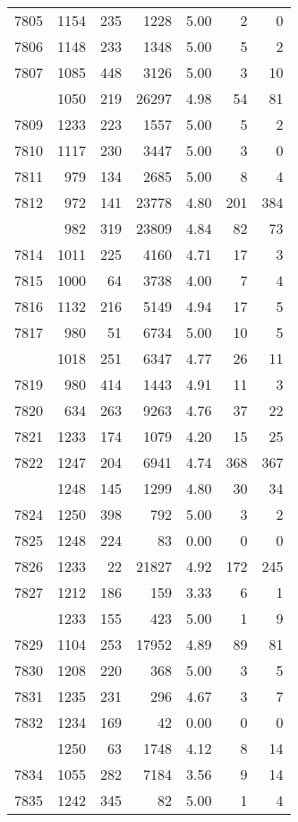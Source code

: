 \documentclass[
]{article}
\begin{document}
\begin{table}
\begin{tabular}[t]{lrrrrrr}
7805 & 1154 & 235 & 1228 & 5.00 & 2 & 0\\
7806 & 1148 & 233 & 1348 & 5.00 & 5 & 2\\
7807 & 1085 & 448 & 3126 & 5.00 & 3 & 10\\
\addlinespace
7808 & 1050 & 219 & 26297 & 4.98 & 54 & 81\\
7809 & 1233 & 223 & 1557 & 5.00 & 5 & 2\\
7810 & 1117 & 230 & 3447 & 5.00 & 3 & 0\\
7811 & 979 & 134 & 2685 & 5.00 & 8 & 4\\
7812 & 972 & 141 & 23778 & 4.80 & 201 & 384\\
\addlinespace
7813 & 982 & 319 & 23809 & 4.84 & 82 & 73\\
7814 & 1011 & 225 & 4160 & 4.71 & 17 & 3\\
7815 & 1000 & 64 & 3738 & 4.00 & 7 & 4\\
7816 & 1132 & 216 & 5149 & 4.94 & 17 & 5\\
7817 & 980 & 51 & 6734 & 5.00 & 10 & 5\\
\addlinespace
7818 & 1018 & 251 & 6347 & 4.77 & 26 & 11\\
7819 & 980 & 414 & 1443 & 4.91 & 11 & 3\\
7820 & 634 & 263 & 9263 & 4.76 & 37 & 22\\
7821 & 1233 & 174 & 1079 & 4.20 & 15 & 25\\
7822 & 1247 & 204 & 6941 & 4.74 & 368 & 367\\
\addlinespace
7823 & 1248 & 145 & 1299 & 4.80 & 30 & 34\\
7824 & 1250 & 398 & 792 & 5.00 & 3 & 2\\
7825 & 1248 & 224 & 83 & 0.00 & 0 & 0\\
7826 & 1233 & 22 & 21827 & 4.92 & 172 & 245\\
7827 & 1212 & 186 & 159 & 3.33 & 6 & 1\\
\addlinespace
7828 & 1233 & 155 & 423 & 5.00 & 1 & 9\\
7829 & 1104 & 253 & 17952 & 4.89 & 89 & 81\\
7830 & 1208 & 220 & 368 & 5.00 & 3 & 5\\
7831 & 1235 & 231 & 296 & 4.67 & 3 & 7\\
7832 & 1234 & 169 & 42 & 0.00 & 0 & 0\\
\addlinespace
7833 & 1250 & 63 & 1748 & 4.12 & 8 & 14\\
7834 & 1055 & 282 & 7184 & 3.56 & 9 & 14\\
7835 & 1242 & 345 & 82 & 5.00 & 1 & 4\\

\end{tabular}
\end{table}
\end{document}
